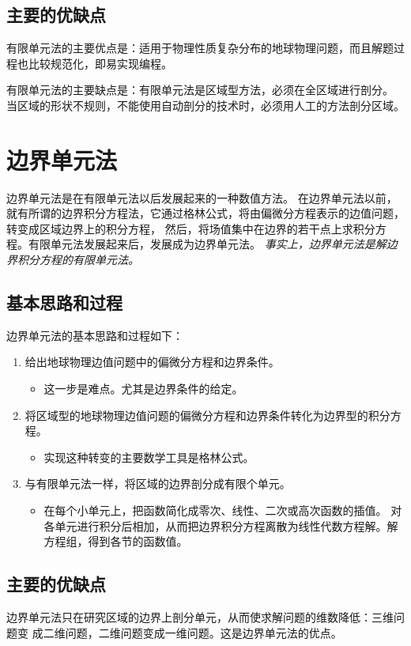 \documentclass[hyperref,UTF-8]{ctexart}
\begin{document}
\subsection{主要的优缺点}
有限单元法的主要优点是：适用于物理性质复杂分布的地球物理问题，而且解题过程也比较规范化，即易实现编程。

有限单元法的主要缺点是：有限单元法是区域型方法，必须在全区域进行剖分。
当区域的形状不规则，不能使用自动剖分的技术时，必须用人工的方法剖分区域。
\section{边界单元法}
边界单元法是在有限单元法以后发展起来的一种数值方法。
在边界单元法以前，就有所谓的边界积分方程法，它通过格林公式，将由偏微分方程表示的边值问题，转变成区域边界上的积分方程，
然后，将场值集中在边界的若干点上求积分方程。有限单元法发展起来后，发展成为边界单元法。
\emph{事实上，边界单元法是解边界积分方程的有限单元法。}
\subsection{基本思路和过程}
边界单元法的基本思路和过程如下：
\begin{enumerate}
\item 给出地球物理边值问题中的偏微分方程和边界条件。
\begin{itemize}
\item 这一步是难点。尤其是边界条件的给定。
\end{itemize}
\item 将区域型的地球物理边值问题的偏微分方程和边界条件转化为边界型的积分方程。
\begin{itemize}
\item 实现这种转变的主要数学工具是格林公式。
\end{itemize}
\item 与有限单元法一样，将区域的边界剖分成有限个单元。
\begin{itemize}
\item 在每个小单元上，把函数简化成零次、线性、二次或高次函数的插值。
对各单元进行积分后相加，从而把边界积分方程离散为线性代数方程解。解方程组，得到各节的函数值。
\end{itemize}
\end{enumerate}
\subsection{主要的优缺点}
边界单元法只在研究区域的边界上剖分单元，从而使求解问题的维数降低：三维问题变
成二维问题，二维问题变成一维问题。这是边界单元法的优点。
\end{document}
